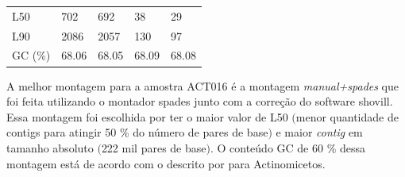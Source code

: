 \begin{table}[htb]
{\begin{tabular}{lllll}
		L50                                          & 702                                    & 692                                     & 38                                & 29                                                             \\
		L90                                          & 2086                                   & 2057                                    & 130                               & 97                                                                 \\
		GC (\%)                                      & 68.06                                  & 68.05                                   & 68.09                             & 68.08                                                        \\
	\bottomrule
    \end{tabular}
	}{%
	\centering
	  }
\end{table}


A melhor montagem para a amostra ACT016 é a montagem \textit{manual+spades} que foi feita utilizando
o montador spades junto com a correção do software shovill. Essa montagem foi escolhida por ter o maior
valor de L50 $($menor quantidade de contigs para atingir 50 \% do número de pares de base$)$ e maior 
\textit{contig} em tamanho absoluto $($222 mil pares de base$)$. O conteúdo GC de 60 \% dessa montagem está de acordo
com o descrito por  para Actinomicetos.

